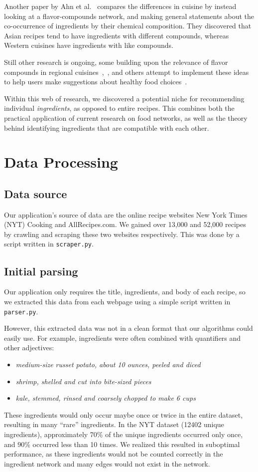 \documentclass{acm_proc_article-sp}
\begin{document}
Another paper by Ahn et al.~\cite{pairings} compares the differences in cuisine by instead looking at a flavor-compounds network, and making general statements about the co-occurrence of ingredients by their chemical composition. They discovered that Asian recipes tend to have ingredients with different compounds, whereas Western cuisines have ingredients with like compounds. 

Still other research is ongoing, some building upon the relevance of flavor compounds 
in regional cuisines~\cite{zhu2013geography},~\cite{jain2015analysis}, and others attempt to implement these ideas to help users make suggestions about healthy food choices~\cite{Geleijnse}.

Within this web of research, we discovered a potential niche for recommending individual \textit{ingredients}, as opposed to entire recipes. This combines both the practical application of current research on food networks, as well as the theory behind identifying ingredients that are compatible with each other.


\clearpage
\section{Data Processing}

\subsection{Data source}
Our application's source of data are the online recipe websites New York Times (NYT) Cooking and AllRecipes.com. We gained over 13,000 and 52,000 recipes by crawling and scraping these two websites respectively. This was done by a script written in \texttt{scraper.py}. 

\subsection{Initial parsing}
Our application only requires the title, ingredients, and body of each recipe, so we extracted this data from each webpage using a simple script written in \texttt{parser.py}.

However, this extracted data was not in a clean format that our algorithms could easily use. For example, ingredients were often combined with quantifiers and other adjectives:
\begin{itemize}
       \item {\em medium-size russet potato, about 10 ounces, peeled and diced}
       \item {\em shrimp, shelled and cut into bite-sized pieces}
       \item {\em kale, stemmed, rinsed and coarsely chopped to make 6 cups}
\end{itemize}
These ingredients would only occur maybe once or twice in the entire dataset, resulting in many ``rare'' ingredients. In the NYT dataset (12402 unique ingredients), approximately 70\% of the unique ingredients occurred only once, and 90\% occurred less than 10 times. We realized this resulted in suboptimal performance, as these ingredients would not be counted correctly in the ingredient network and many edges would not exist in the network.
\end{document}
